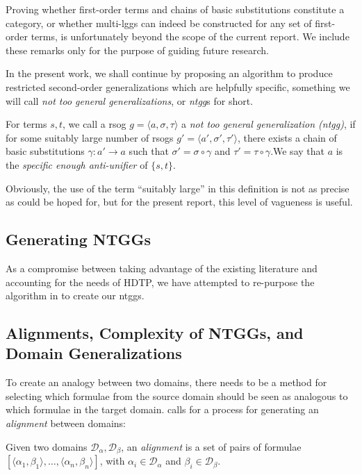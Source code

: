 \documentclass[12pt,a4paper]{article}
\begin{document}
Proving whether first-order terms and chains of basic substitutions
constitute a category, or whether multi-lggs can indeed be constructed
for any set of first-order terms, is unfortunately beyond the scope of
the current report. We include these remarks only for the purpose of
guiding future research. 

In the present work, we shall continue by proposing an algorithm to
produce restricted second-order generalizations which are helpfully
specific, something we will call \textit{not too general
generalizations}, or \textit{ntgg}s for short.

\begin{definition}
    For terms $s,t$, we call a rsog $g = \langle a, \sigma, \tau \rangle$ a \textit{not too general generalization (ntgg)}, if for some suitably large number of rsogs $g' = \langle a', \sigma', \tau' \rangle$, there exists a chain of basic substitutions $\gamma : a' \to a$ such that $\sigma' = \sigma \circ \gamma$ and $\tau' = \tau \circ \gamma$.\quad We say that $a$ is the \textit{specific enough anti-unifier} of $\{s,t\}$.
\end{definition}

Obviously, the use of the term ``suitably large'' in this definition is not as precise as could be hoped for, but for the present report, this level of vagueness is useful. 

\subsection{Generating NTGGs}
As a compromise between taking advantage of the existing literature
and accounting for the needs of HDTP, we have attempted to re-purpose
the algorithm in \cite{Tabareau2013AntiUnificationWT} to create our
ntggs.


\subsection{Alignments, Complexity of NTGGs, and Domain Generalizations}
To create an analogy between two domains, there needs to be a method
for selecting which formulae from the source domain should be seen as
analogous to which formulae in the target domain. \cite{Schmidt-2014}
calls for a process for generating an \textit{alignment} between
domains:

\begin{definition}[Alignment]
    Given two domains $\mathcal{D}_\alpha, \mathcal{D}_\beta$, an \textit{alignment} is a set of pairs of formulae $[\langle \alpha_1, \beta_1\rangle, \dots, \langle \alpha_n, \beta_n\rangle ]$, with $\alpha_i \in \mathcal{D}_\alpha$ and $\beta_i \in \mathcal{D}_\beta$.
\end{definition} 
\end{document}
